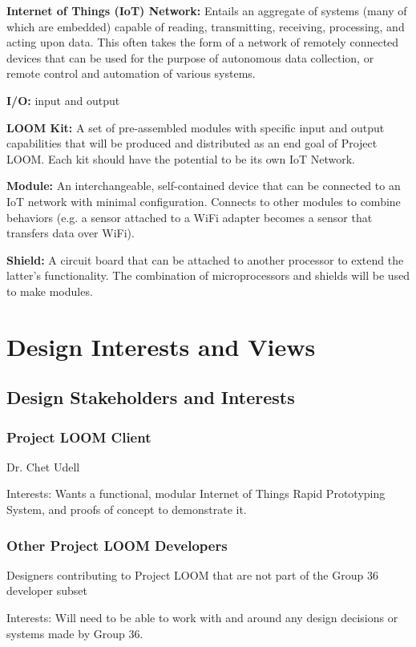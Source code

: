 \documentclass[onecolumn, draftclsnofoot,10pt, compsoc]{IEEEtran}
\begin{document}
    \textbf{Internet of Things (IoT) Network:} Entails an aggregate of systems (many of which are embedded) capable of reading, transmitting, receiving, processing, and acting upon data. This often takes the form of a network of remotely connected devices that can be used for the purpose of autonomous data collection, or remote control and automation of various systems.

    \textbf{I/O:} input and output

    \textbf{LOOM Kit:} A set of pre-assembled modules with specific input and output capabilities that will be produced and distributed as an end goal of Project LOOM. Each kit should have the potential to be its own IoT Network. 

    \textbf{Module:} An interchangeable, self-contained device that can be connected to an IoT network with minimal configuration. Connects to other modules to combine behaviors (e.g. a sensor attached to a WiFi adapter becomes a sensor that transfers data over WiFi).

    \textbf{Shield:} A circuit board that can be attached to another processor to extend the latter's functionality. The combination of microprocessors and shields will be used to make modules.




\section{Design Interests and Views}
\subsection{Design Stakeholders and Interests}

\subsubsection{Project LOOM Client}
    Dr. Chet Udell

    Interests: Wants a functional, modular Internet of Things Rapid Prototyping System, and proofs of concept to demonstrate it.

\subsubsection{Other Project LOOM Developers}
    Designers contributing to Project LOOM that are not part of the Group 36 developer subset

    Interests: Will need to be able to work with and around any design decisions or systems made by Group 36.
\end{document}
